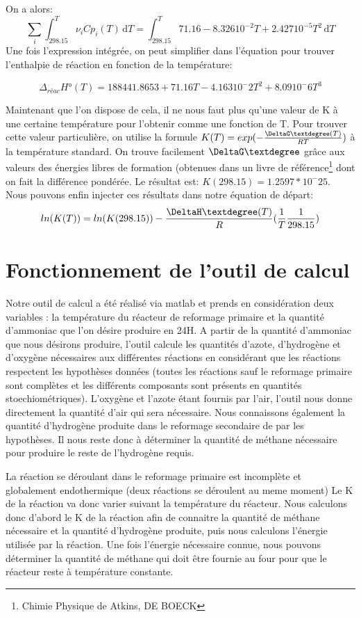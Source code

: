 \documentclass[a4paper, oneside, 12pt]{article}
\begin{document}
On a alors:
\begin{equation}
	\sum_i \int_298.15^T \nu_i Cp_i(T) \, \mathrm dT=\int_298.15^T 71.16-8.326 10^{-2}T+2.427 10^{-5}T^2 \, \mathrm dT
\end{equation}
Une fois l'expression intégrée, on peut simplifier dans l'équation pour trouver l'enthalpie de réaction en fonction de la température:

\begin{equation}
	\Delta_{réac}H°(T)=188441.8653+71.16T-4.163 10^-2 T^2 + 8.09 10^-6 T^3
\end{equation}

Maintenant que l'on dispose de cela, il ne nous faut plus qu'une valeur de K à une certaine température pour l'obtenir comme une fonction de T. Pour trouver cette valeur particulière, on utilise la formule $K(T)=exp(-\frac{\DeltaG°(T)}{RT})$ à la température standard. On trouve facilement $\DeltaG°$ grâce aux valeurs des énergies libres de formation (obtenues dans un livre de référence\footnote{Chimie Physique de Atkins, DE BOECK} dont on fait la différence pondérée. Le résultat est: $K(298.15)=1.2597*10^-25$.\\
Nous pouvons enfin injecter ces résultats dans notre équation de départ:
\begin{equation}
	ln(K(T))=ln(K(298.15))-\frac{\DeltaH°(T)}{R}(\frac{1}{T}\frac{1}{298.15})
\end{equation}

\section{Fonctionnement de l'outil de calcul}

Notre outil de calcul a été réalisé via matlab et prends en considération deux variables : la température du réacteur de 
reformage primaire et la quantité d'ammoniac que l'on désire produire en 24H. A partir de la quantité d'ammoniac que nous désirons 
produire, l'outil calcule les quantités d'azote, d'hydrogène et d'oxygène nécessaires aux différentes réactions en considérant que
les réactions respectent les hypothèses données (toutes les réactions sauf le reformage primaire sont complètes et les différents composants sont présents en 
quantités stoechiométriques). L'oxygène et l'azote étant fournis par l'air, l'outil nous donne directement la quantité d'air qui sera
nécessaire. Nous connaissons également la quantité d'hydrogène produite dans le reformage secondaire de par les hypothèses. 
Il nous reste donc à déterminer la quantité de méthane nécessaire pour produire le reste de l'hydrogène requis. 

La réaction se déroulant dans le reformage primaire est incomplète et globalement endothermique (deux réactions se déroulent au meme moment)
Le K de la réaction va donc varier suivant la température du réacteur. Nous calculons donc d'abord le K de la réaction afin de 
connaitre la quantité de méthane nécessaire et la quantité d'hydrogène produite, puis nous calculons l'énergie utilisée par la réaction.
Une fois l'énergie nécessaire connue, nous pouvons déterminer la quantité de méthane qui doit être fournie au four pour que le réacteur reste à température constante.
\end{document}
